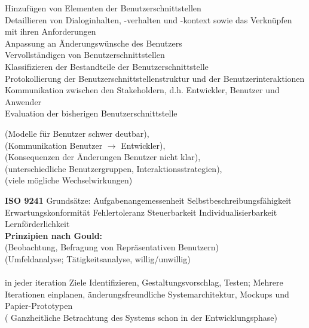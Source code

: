 Hinzufügen von Elementen der Benutzerschnittstellen\\
Detaillieren von Dialoginhalten, -verhalten und -kontext sowie das Verknüpfen mit ihren Anforderungen\\
Anpassung an Änderungswünsche des Benutzers\\
Vervollständigen von Benutzerschnittstellen\\
Klassifizieren der Bestandteile der Benutzerschnittstelle\\
Protokollierung der Benutzerschnittstellenstruktur und der Benutzerinteraktionen\\
Kommunikation zwischen den Stakeholdern, d.h. Entwickler, Benutzer und Anwender\\
Evaluation der bisherigen Benutzerschnittstelle

 (Modelle für Benutzer schwer deutbar), \\
 (Kommunikation Benutzer $\rightarrow$ Entwickler),\\
(Konsequenzen der Änderungen Benutzer nicht klar), \\
 (unterschiedliche Benutzergruppen, Interaktionsstrategien),\\
 (viele mögliche Wechselwirkungen)

\textbf{ISO 9241} Grundsätze: Aufgabenangemessenheit Selbstbeschreibungsfähigkeit Erwartungskonformität Fehlertoleranz Steuerbarkeit Individualisierbarkeit Lernförderlichkeit\\
\textbf{Prinzipien nach Gould:}\\
(Beobachtung, Befragung von Repräsentativen Benutzern) \\
 (Umfeldanalyse; Tätigkeitsanalyse,  willig/unwillig) \\
\\
 in jeder iteration Ziele Identifizieren, Gestaltungsvorschlag, Testen; Mehrere Iterationen einplanen, änderungsfreundliche Systemarchitektur, Mockups und Papier-Prototypen\\
( Ganzheitliche Betrachtung des Systems schon in der Entwicklungsphase)
